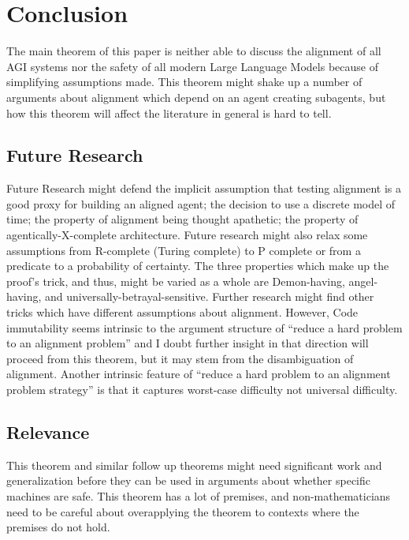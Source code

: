 \documentclass[12pt]{article}
\begin{document}
\section{Conclusion}
The main theorem of this paper is neither able to discuss the alignment of all AGI systems nor the safety of all modern Large Language Models because of simplifying assumptions made. This theorem might shake up a number of arguments about alignment which depend on an agent creating subagents, but how this theorem will affect the literature in general is hard to tell.

\subsection{Future Research}
Future Research might defend the implicit assumption that testing alignment is a good proxy for building an aligned agent; the decision to use a discrete model of time; the property of alignment being thought apathetic; the property of agentically-X-complete architecture. Future research might also relax some assumptions from R-complete (Turing complete) to P complete or from a predicate to a probability of certainty. The three properties which make up the proof's trick, and thus, might be varied as a whole are Demon-having, angel-having, and universally-betrayal-sensitive. Further research might find other tricks which have different assumptions about alignment. However, Code immutability seems intrinsic to the argument structure of ``reduce a hard problem to an alignment problem'' and I doubt further insight in that direction will proceed from this theorem, but it may stem from the disambiguation of alignment. Another intrinsic feature of ``reduce a hard problem to an alignment problem strategy'' is that it captures worst-case difficulty not universal difficulty. 
\subsection{Relevance}
This theorem and similar follow up theorems might need significant work and generalization before they can be used in arguments about whether specific machines are safe. This theorem has a lot of premises, and non-mathematicians need to be careful about overapplying the theorem to contexts where the premises do not hold.



\end{document}
